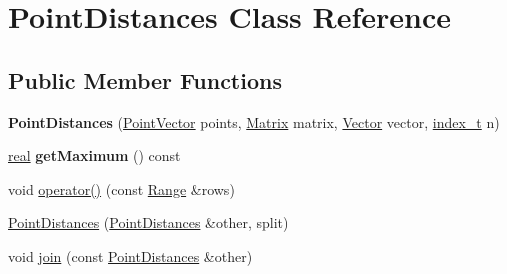 \hypertarget{class_point_distances}{
\section{PointDistances Class Reference}
\label{class_point_distances}
}
\subsection*{Public Member Functions}
\begin{CompactItemize}
\item 
\hypertarget{class_point_distances_12dba51e28ac2cf5ac0c9317d9ff242e}{
\textbf{PointDistances} (\hyperlink{class_point}{PointVector} points, \hyperlink{cowichan_8hpp_3fb46f939e55c239fbc95656fc0f3399}{Matrix} matrix, \hyperlink{cowichan_8hpp_02bc1553e241b9b33408482658b3c355}{Vector} vector, \hyperlink{cowichan_8hpp_5b04577d5d21124855deaad298595371}{index\_\-t} n)}
\label{class_point_distances_12dba51e28ac2cf5ac0c9317d9ff242e}

\item 
\hypertarget{class_point_distances_ec6ace35911f7e26d573023f2381c673}{
\hyperlink{cowichan_8hpp_4d521b2c54a1f6312cc8fa04827eaf98}{real} \textbf{getMaximum} () const }
\label{class_point_distances_ec6ace35911f7e26d573023f2381c673}

\item 
void \hyperlink{class_point_distances_ab3ec991122054f46c2d5b5f7f91e972}{operator()} (const \hyperlink{cowichan__tbb_8hpp_8e2057f725b08f3a15513c378a453a47}{Range} \&rows)
\item 
\hyperlink{class_point_distances_59396cd3119746888d0601cd78757da3}{PointDistances} (\hyperlink{class_point_distances}{PointDistances} \&other, split)
\item 
void \hyperlink{class_point_distances_609701c6fa66e3f0406db82bc70453d9}{join} (const \hyperlink{class_point_distances}{PointDistances} \&other)
\end{CompactItemize}
